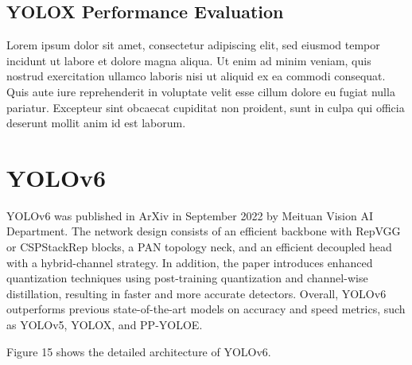 \documentclass{article}
\begin{document}
\subsection{YOLOX Performance Evaluation}


Lorem ipsum dolor sit amet, consectetur adipiscing elit, sed eiusmod tempor incidunt ut labore et dolore magna aliqua. Ut enim ad minim veniam, quis nostrud exercitation ullamco laboris nisi ut aliquid ex ea commodi consequat. Quis aute iure reprehenderit in voluptate velit esse cillum dolore eu fugiat nulla pariatur. Excepteur sint obcaecat cupiditat non proident, sunt in culpa qui officia deserunt mollit anim id est laborum.



\section{YOLOv6}


YOLOv6 \cite{li2022yolov6} was published in ArXiv in September 2022 by Meituan Vision AI Department. The network design consists of an efficient backbone with RepVGG or CSPStackRep blocks, a PAN topology neck, and an efficient decoupled head with a hybrid-channel strategy. In addition, the paper introduces enhanced quantization techniques using post-training quantization and channel-wise distillation, resulting in faster and more accurate detectors. Overall, YOLOv6 outperforms previous state-of-the-art models on accuracy and speed metrics, such as YOLOv5, YOLOX, and PP-YOLOE.

Figure 15 shows the detailed architecture of YOLOv6.
\end{document}
